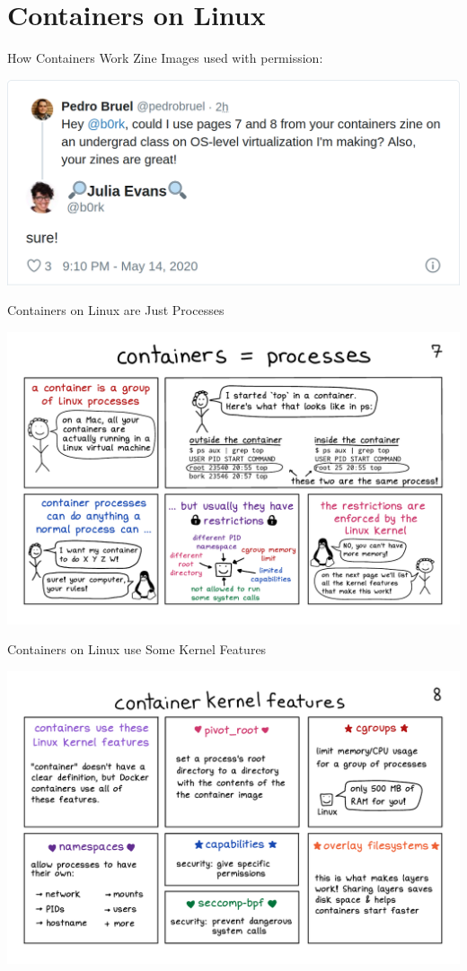 \documentclass[10pt, compress, aspectratio=169, xcolor={table,usenames,dvipsnames}]{beamer}
\begin{document}
\section{Containers on Linux}
\label{sec:orgfd27a3c}
\begin{frame}[label={sec:org9136ecf}]{How Containers Work Zine}
Images used \alert{with permission}:
\begin{center}
\includegraphics[width=.72\columnwidth]{../../img/hcw_permission_twitter.png}
\end{center}
\end{frame}
\begin{frame}[label={sec:orgfb02269}]{Containers on Linux are Just Processes}
\begin{center}
\includegraphics[width=.86\columnwidth]{../../img/how-containers-work_pg7.pdf}
\end{center}
\end{frame}
\begin{frame}[label={sec:orgac7956a}]{Containers on Linux use Some Kernel Features}
\begin{center}
\includegraphics[width=.86\columnwidth]{../../img/how-containers-work_pg8.pdf}
\end{center}
\end{frame}
\end{document}
